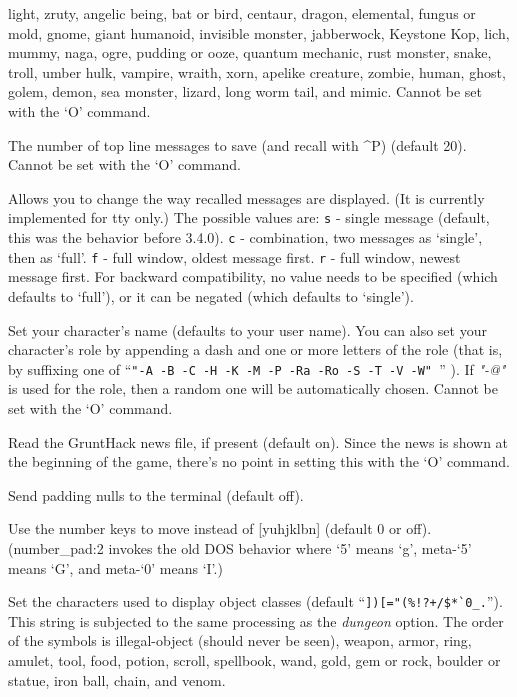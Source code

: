 light, zruty,
angelic being, bat or bird, centaur,
dragon, elemental, fungus or mold,
gnome, giant humanoid, invisible monster,
jabberwock, Keystone Kop, lich,
mummy, naga, ogre,
pudding or ooze, quantum mechanic, rust monster,
snake, troll, umber hulk,
vampire, wraith, xorn,
apelike creature, zombie,
human, ghost, golem,
demon, sea monster, lizard,
long worm tail, and mimic.
Cannot be set with the `O' command.
\item[\tb{msghistory}]
The number of top line messages to save (and recall with \^{}P) (default 20).
Cannot be set with the `O' command.
\item[\tb{msg\_window}]
Allows you to change the way recalled messages are displayed.
(It is currently implemented for tty only.)
The possible values are:
{\tt s} - single message (default, this was the behavior before 3.4.0).
{\tt c} - combination, two messages as `single', then as `full'.
{\tt f} - full window, oldest message first.
{\tt r} - full window, newest message first.
For backward compatibility, no value needs to be specified (which
defaults to `full'), or it can be negated (which defaults to `single').
\item[\tb{"name    "}]
Set your character's name (defaults to your user name).  You can also
set your character's role by appending a dash and one or more letters of
the role (that is, by suffixing one of
``{\tt "-A -B -C -H -K -M -P -Ra -Ro -S -T -V -W" }'' ).
If
{\it "-@" }
is used for the role, then a random one will be automatically chosen.
Cannot be set with the `O' command.
\item[\tb{"news    "}]
Read the GruntHack news file, if present (default on).
Since the news is shown at the beginning of the game, there's no point
in setting this with the `O' command.
\item[\tb{"null    "}]
Send padding nulls to the terminal (default off).
\item[\tb{number\_pad}]
Use the number keys to move instead of [yuhjklbn] (default 0 or off).
(number\_pad:2 invokes the old DOS behavior where `5' means `g', meta-`5'
means `G',  and meta-`0' means `I'.)
\item[\tb{objects}]
Set the characters used to display object classes
 (default
``\verb&])[="(%!?+/$*`0_.&'').
This string is subjected to the same processing as the
{\it dungeon }
option.
The order of the symbols is
illegal-object (should never be seen), weapon, armor, ring, amulet, tool,
food, potion, scroll, spellbook, wand, gold, gem or rock, boulder or statue,
iron ball, chain, and venom.
